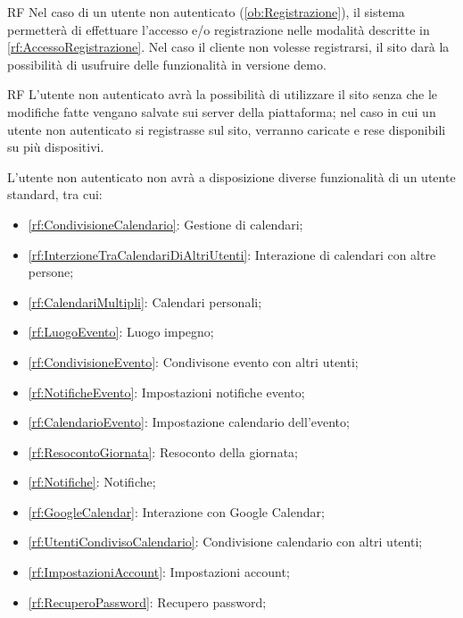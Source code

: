 \begin{listaPersonale}{RF}
	 Nel caso di un utente non autenticato (\ref{ob:Registrazione}), il sistema permetterà di effettuare l'accesso e/o registrazione nelle modalità descritte in \ref{rf:AccessoRegistrazione}. Nel caso il cliente non volesse registrarsi, il sito darà la possibilità di usufruire delle funzionalità in versione demo.
	\begin{listaPersonale2}{RF}
		 L'utente non autenticato avrà la possibilità di utilizzare il sito senza che le modifiche fatte vengano salvate sui server della piattaforma; nel caso in cui un utente non autenticato si registrasse sul sito, verranno caricate e rese disponibili su più dispositivi.
		\begin{listaPersonale3}[RF]{}
			 L'utente non autenticato non avrà a disposizione diverse funzionalità di un utente standard, tra cui:
			\begin{itemize}
				\item \ref{rf:CondivisioneCalendario}: Gestione di calendari;
				\item \ref{rf:InterzioneTraCalendariDiAltriUtenti}: Interazione di calendari con altre persone;
				\item \ref{rf:CalendariMultipli}: Calendari personali;
				\item \ref{rf:LuogoEvento}: Luogo impegno;
				\item \ref{rf:CondivisioneEvento}: Condivisone evento con altri utenti;
				\item \ref{rf:NotificheEvento}: Impostazioni notifiche evento;
				\item \ref{rf:CalendarioEvento}: Impostazione calendario dell'evento;
				\item \ref{rf:ResocontoGiornata}: Resoconto della giornata;
				\item \ref{rf:Notifiche}: Notifiche;
				\item \ref{rf:GoogleCalendar}: Interazione con Google Calendar;
				\item \ref{rf:UtentiCondivisoCalendario}: Condivisione calendario con altri utenti;
				\item \ref{rf:ImpostazioniAccount}: Impostazioni account;
				\item \ref{rf:RecuperoPassword}: Recupero password;
			\end{itemize}
		\end{listaPersonale3}
	\end{listaPersonale2}


\end{listaPersonale}
